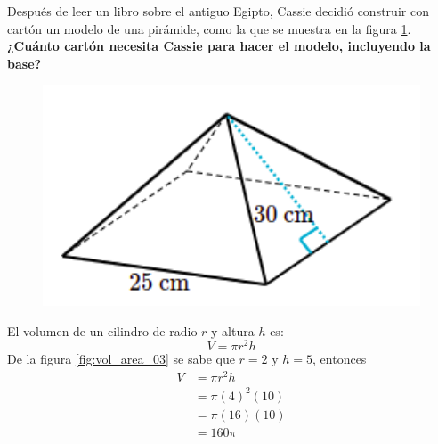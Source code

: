 \question[10] Después de leer un libro sobre el antiguo Egipto, Cassie decidió construir con cartón un modelo de una pirámide,
como la que se muestra en la figura \ref{fig:prob_verb_superficie_05}.
\textbf{¿Cuánto cartón necesita Cassie para hacer el modelo, incluyendo la base?}

\begin{minipage}{0.3\linewidth}
    \begin{figure}[H]
        \begin{center}
            \includegraphics[width=1\textwidth]{../images/prob_verb_superficie_05}
        \end{center}
        \caption{}
        \label{fig:prob_verb_superficie_05}
    \end{figure}
\end{minipage}
\begin{minipage}{0.7\linewidth}
    \begin{solutionbox}{6cm}
        El volumen de un cilindro de radio $r$ y altura $h$ es:
        \begin{equation*}
            V = \pi r^2 h
        \end{equation*}
        De la figura \ref{fig:vol_area_03} se sabe que $r=2$ y $h=5$, entonces
        \begin{equation*}
            \begin{split}
                V & = \pi r^2 h\\
                & = \pi (4)^2 (10)\\
                & = \pi (16) (10)\\
                & = 160\pi
            \end{split}
        \end{equation*}
    \end{solutionbox}
\end{minipage}